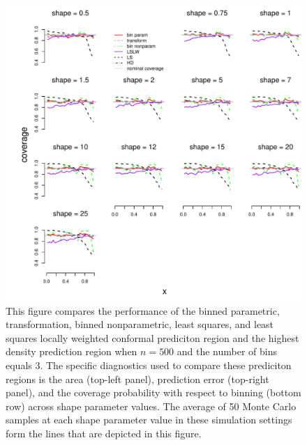 \documentclass[11pt]{article}\usepackage[]{graphicx}\usepackage[]{color}
\makeatletter
\def\maxwidth{ %
  \ifdim\Gin@nat@width>\linewidth
    \linewidth
  \else
    \Gin@nat@width
  \fi
}
\newenvironment{knitrout}{}{} %
\makeatother
\begin{document}
\newpage
\begin{figure}[h!]
\begin{center}
\begin{knitrout}
\color{fgcolor}
\includegraphics[width=\maxwidth]{figure/Fig-gamma-inx-500-1} 

\end{knitrout}
\end{center}
\caption{This figure compares the performance of the 
  binned parametric,
  transformation, 
  binned nonparametric,
  least squares, and 
  least squares locally weighted conformal prediciton region and the 
  highest density prediction region when $n = 500$ and the number of bins 
  equals 3.  
  The specific diagnostics used to compare these prediciton regions is the 
    area (top-left panel),
    prediction error (top-right panel), and
    the coverage probability with respect to binning (bottom row) 
    across shape parameter values.
  The average of 50 Monte Carlo samples at each shape parameter value in 
  these simulation settings form the lines that are depicted in this figure.}
\label{Fig:gamma.inx.500}
\end{figure}
\end{document}
